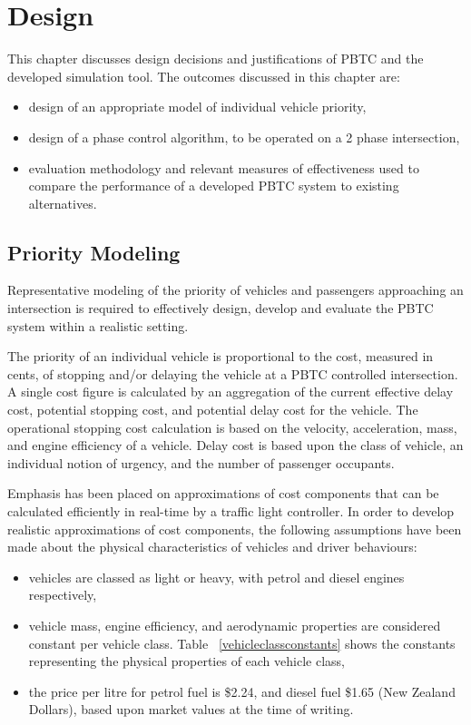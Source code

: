 \chapter{Design}

This chapter discusses design decisions and justifications of PBTC and the developed simulation tool. The outcomes discussed in this chapter are:

\begin{itemize}
\item design of an appropriate model of individual vehicle priority,
\item design of a phase control algorithm, to be operated on a 2 phase intersection,
\item evaluation methodology and relevant measures of effectiveness used to compare the performance of a developed PBTC system to existing alternatives.
\end{itemize}

\section{Priority Modeling}

Representative modeling of the priority of vehicles and passengers approaching an intersection is required to effectively design, develop and evaluate the PBTC system within a realistic setting. 

The priority of an individual vehicle is proportional to the cost, measured in cents, of stopping and/or delaying the vehicle at a PBTC controlled intersection. A single cost figure is calculated by an aggregation of the current effective delay cost, potential stopping cost, and potential delay cost for the vehicle. The operational stopping cost calculation is based on the velocity, acceleration, mass, and engine efficiency of a vehicle. Delay cost is based upon the class of vehicle, an individual notion of urgency, and the number of passenger occupants.

Emphasis has been placed on approximations of cost components that can be calculated efficiently in real-time by a traffic light controller. In order to develop realistic approximations of cost components, the following assumptions have been made about the physical characteristics of vehicles and driver behaviours:

\begin{itemize}
\item vehicles are classed as light or heavy, with petrol and diesel engines respectively,
\item vehicle mass, engine efficiency, and aerodynamic properties are considered constant per vehicle class. Table ~\ref{vehicleclassconstants} shows the constants representing the physical properties of each vehicle class,
\item the price per litre for petrol fuel is \$2.24, and diesel fuel \$1.65 (New Zealand Dollars), based upon market values at the time of writing.
\end{itemize}

